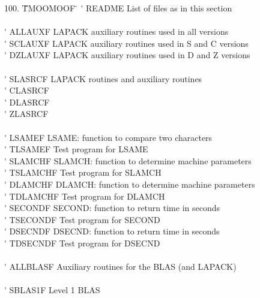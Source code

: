 \setcounter{titem}{0}
\begin{tabbing}
100. \= \=TMOOMOOF  \= \kill
 \> \titem  \' \>  README    \> List of files as in this section \\
 \vspace{0.1ex} \\
 \> \titem \' \>  ALLAUXF   \> LAPACK auxiliary routines used in all versions \\
 \> \titem \' \>  SCLAUXF   \> LAPACK auxiliary routines used in S and C versions \\
 \> \titem \' \>  DZLAUXF   \> LAPACK auxiliary routines used in D and Z versions \\
    \vspace{0.1ex} \\
 \> \titem \' \>  SLASRCF \> LAPACK routines and auxiliary routines \\
 \> \titem \' \>  CLASRCF \> \\
 \> \titem \' \>  DLASRCF \> \\
 \> \titem \' \>  ZLASRCF \> \\
    \vspace{0.1ex} \\
 \> \titem \' \> LSAMEF  \> LSAME: function to compare two characters \\
 \> \titem \' \> TLSAMEF \> Test program for LSAME \\
 \> \titem \' \> SLAMCHF \> SLAMCH: function to determine machine parameters \\
 \> \titem \' \> TSLAMCHF\> Test program for SLAMCH \\
 \> \titem \' \> DLAMCHF \> DLAMCH: function to determine machine parameters \\
 \> \titem \' \> TDLAMCHF\> Test program for DLAMCH \\
 \> \titem \' \> SECONDF \> SECOND: function to return time in seconds \\
 \> \titem \' \> TSECONDF\> Test program for SECOND \\
 \> \titem \' \> DSECNDF \> DSECND: function to return time in seconds \\
 \> \titem \' \> TDSECNDF\> Test program for DSECND \\
\vspace{0.1ex} \\
 \> \titem \' \> ALLBLASF \> Auxiliary routines for the BLAS (and LAPACK) \\
\vspace{0.1ex} \\
 \> \titem \' \> SBLAS1F \> Level 1 BLAS \\

\end{tabbing}
